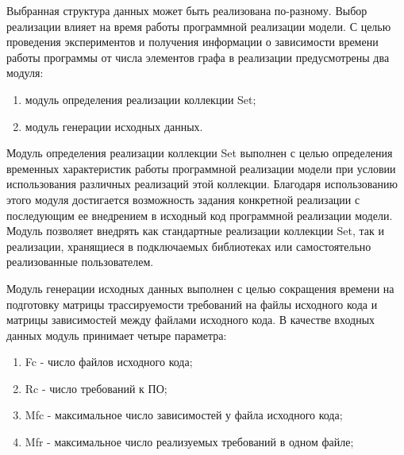 Выбранная структура данных может быть реализована по-разному. Выбор реализации влияет на время работы программной реализации модели. С целью проведения экспериментов и получения информации о зависимости времени работы программы от числа элементов графа в реализации предусмотрены два модуля:
\begin{enumerate}
    \item модуль определения реализации коллекции Set;
    \item модуль генерации исходных данных.
\end{enumerate}

Модуль определения реализации коллекции Set выполнен с целью определения временных характеристик работы программной реализации модели при условии использования различных реализаций этой коллекции. Благодаря использованию этого модуля достигается возможность задания конкретной реализации с последующим ее внедрением в исходный код программной реализации модели. Модуль позволяет внедрять как стандартные реализации коллекции Set, так и реализации, хранящиеся в подключаемых библиотеках или самостоятельно реализованные пользователем.

Модуль генерации исходных данных выполнен с целью сокращения времени на подготовку матрицы трассируемости требований на файлы исходного кода и матрицы зависимостей между файлами исходного кода. В качестве входных данных модуль принимает четыре параметра:
\begin{enumerate}
    \item Fc - число файлов исходного кода;
    \item Rc - число требований к ПО;
    \item Mfc - максимальное число зависимостей у файла исходного кода;
    \item Mfr - максимальное число реализуемых требований в одном файле;
\end{enumerate}